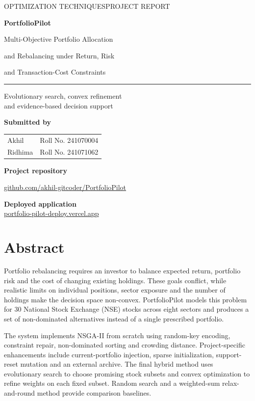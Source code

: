 \documentclass[12pt,a4paper]{article}
\begin{document}
\begin{titlepage}
\color{navy}\sffamily
{\small OPTIMIZATION TECHNIQUES\hfill PROJECT REPORT\par}
\vspace{20mm}
{\fontsize{38}{44}\selectfont\bfseries PortfolioPilot\par}
\vspace{5mm}
{\Large Multi-Objective Portfolio Allocation\par and Rebalancing under Return, Risk\par and Transaction-Cost Constraints\par}
\vspace{9mm}\textcolor{teal}{\rule{\linewidth}{2pt}}\par
\vspace{7mm}
{\large Evolutionary search, convex refinement\\[2mm]and evidence-based decision support\par}
\vspace{18mm}
\textbf{Submitted by}\\[5mm]
\begin{tabular}{@{}ll@{}}
Akhil & Roll No. 241070004\\[3mm]
Ridhima & Roll No. 241071062
\end{tabular}
\vfill
{\small\textbf{Project repository}\par}
\href{https://github.com/akhil-gitcoder/PortfolioPilot}{github.com/akhil-gitcoder/PortfolioPilot}\par
\vspace{6mm}
\textbf{Deployed application}\\[2mm]\href{https://portfolio-pilot-deploy.vercel.app/}{portfolio-pilot-deploy.vercel.app}
\end{titlepage}
\section*{Abstract}
Portfolio rebalancing requires an investor to balance expected return, portfolio risk and the cost of changing existing holdings. These goals conflict, while realistic limits on individual positions, sector exposure and the number of holdings make the decision space non-convex. PortfolioPilot models this problem for 30 National Stock Exchange (NSE) stocks across eight sectors and produces a set of non-dominated alternatives instead of a single prescribed portfolio.

The system implements NSGA-II from scratch using random-key encoding, constraint repair, non-dominated sorting and crowding distance. Project-specific enhancements include current-portfolio injection, sparse initialization, support-reset mutation and an external archive. The final hybrid method uses evolutionary search to choose promising stock subsets and convex optimization to refine weights on each fixed subset. Random search and a weighted-sum relax-and-round method provide comparison baselines.
\end{document}
